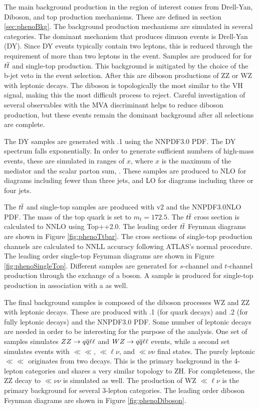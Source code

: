 The main background production in the region of interest comes from Drell-Yan, Diboson, and top production mechanisms.
These are defined in section \ref{sec:phenoBkg}.
The background production mechanisms are simulated in several categories.
The dominant mechanism that produces dimuon events is Drell-Yan (DY). Since DY events typically contain two leptons, this is reduced through the requirement of more than two leptons in the event.
Samples are produced for for $t\overline{t}$ and single-top production. This background is mitigated by the choice of the b-jet veto in the event selection.
After this are diboson productions of ZZ or WZ with leptonic decays. The diboson is topologically the most similar to the VH signal, making this the most difficult process to reject.
Careful investigation of several observables with the MVA discriminant helps to reduce diboson production, but these events remain the dominant background after all selections are complete.

The DY samples are generated with .1 using the NNPDF3.0 PDF. 
The DY \muu spectrum falls exponentially.
In order to generate sufficient numbers of high-mass events, these are simulated in ranges of $x$, where $x$ is the maximum of the mediator \pt and the scalar parton \pt sum, \httt.
These samples are produced to NLO for diagrams including fewer than three jets, and LO for diagrams including three or four jets.

The $t\overline{t}$ and single-top samples are produced with \powheg v2 and the NNPDF3.0NLO PDF.
The mass of the top quark is set to $m_t=172.5$.
The $t\overline{t}$ cross section is calculated to NNLO using Top++2.0. \cite{Czakon:2011xx}
The leading order $t\overline{t}$ Feynman diagrams are shown in Figure \ref{fig:phenoTtbar}.
The cross sections of single-top production channels are calculated to NNLL accuracy following ATLAS's normal procedure. \cite{Kidonakis:2011wy, Kidonakis:2010ux}
The leading order single-top Feynman diagrams are shown in Figure \ref{fig:phenoSingleTop}.
Different samples are generated for $s$-channel and $t$-channel production through the exchange of a \W boson. A sample is produced for single-top production in association with a \W as well.

The final background samples is composed of the diboson processes WZ and ZZ with leptonic decays.
These are produced with .1 (for quark decays) and .2 (for fully leptonic decays) and the NNPDF3.0 PDF.
Some number of leptonic decays are needed in order to be interesting for the purpose of the analysis.
One set of samples simulates $ZZ\to q\overline{q}\ell\ell$ and $WZ\to q\overline{q}\ell\ell$ events, while a second set simulates events with $\ll\ll$, $\ll\ell\nu$, and $\ll\nu\nu$ final states. \cite{ATL-PHYS-PUB-2017-005}
The purely leptonic $\ll\ll$ originates from two \Z decays.
This is the primary background in the 4-lepton categories and shares a very similar topology to ZH.
For completeness, the ZZ decay to $\ll\nu\nu$ is simulated as well.
The production of WZ $\ll\ell\nu$ is the primary background for several 3-lepton categories.
The leading order diboson Feynman diagrams are shown in Figure \ref{fig:phenoDiboson}.

